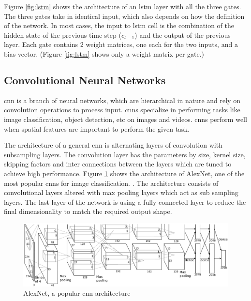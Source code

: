 Figure \ref{fig:lstm} shows the architecture of an \acrshort{lstm} layer with all the three gates. The three gates take in identical input, which also depends on how the definition of the network. In most cases, the input to \acrshort{lstm} cell is the combination of the hidden state of the previous time step ($c_{t-1}$) and the output of the previous layer. Each gate contains 2 weight matrices, one each for the two inputs, and a bias vector. (Figure \ref{fig:lstm} shows only a weight matrix per gate.) 


\subsection {Convolutional Neural Networks}
\acrfull{cnn} is a branch of neural networks, which are hierarchical in nature and rely on convolution operations to process input. \acrshort{cnn}s specialize in performing tasks like image classification, object detection, etc on images and videos. \acrshort{cnn}s perform well when spatial features are important to perform the given task. \cite{Krizhevsky2012ImageNetNetworks}

The architecture of a general \acrshort{cnn} is alternating layers of convolution with subsampling layers. \cite{Ciresan2011FlexibleClassification} The convolution layer has the parameters by size, kernel size, skipping factors and inter connections between the layers which are tuned to achieve high performance. Figure \ref{fig:cnn} shows the architecture of AlexNet, one of the most popular \acrshort{cnn}s for image classification. \cite{Krizhevsky2012ImageNetNetworks}. The architecture consists of convolutional layers altered with max pooling layers which act as sub sampling layers. The last layer of the network is using a fully connected layer to reduce the final dimensionality to match the required output shape.
\begin{figure}[ht]
  \begin{center}
    \includegraphics[width=\textwidth]{images/cnn.png} 
    \caption{AlexNet, a popular \acrshort{cnn} architecture  \cite{Krizhevsky2012ImageNetNetworks}}
    \label{fig:cnn}
  \end{center}
\end{figure}


